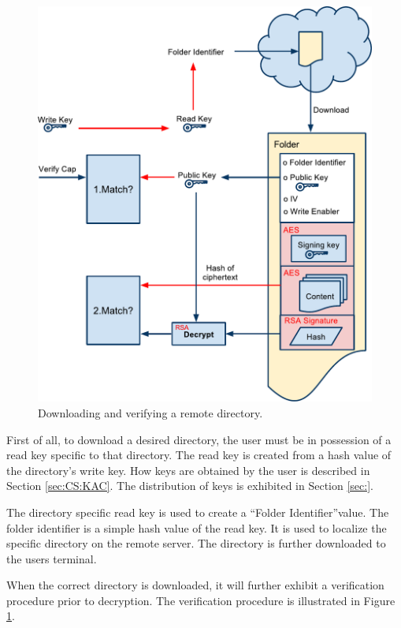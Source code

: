 \documentclass[pdftex,english,10pt,b5paper,twoside]{book}
\begin{document}
\begin{figure}[h!]
    \centering
    \includegraphics[width=\columnwidth]{VerifyOpenFolder.pdf}
    \caption{Downloading and verifying a remote directory.}
    \label{fig:CS:VOD}
\end{figure}

First of all, to download a desired directory, the user must be in
possession of a read key specific to that directory. The read key is created from 
a hash value of the directory's write key. How keys are obtained by the 
user is described in Section \ref{sec:CS:KAC}. The distribution of keys is
exhibited in Section \ref{sec:}.

The directory specific read key is used to create a ``Folder Identifier''value.
The folder identifier is a simple hash value of the read key. It is used to
localize the specific directory on the remote server. The directory is further
downloaded to the users terminal.

When the correct directory is downloaded, it will further exhibit a verification
procedure prior to decryption. The verification procedure is illustrated in
Figure \ref{fig:CS:VOD}.
\end{document}
